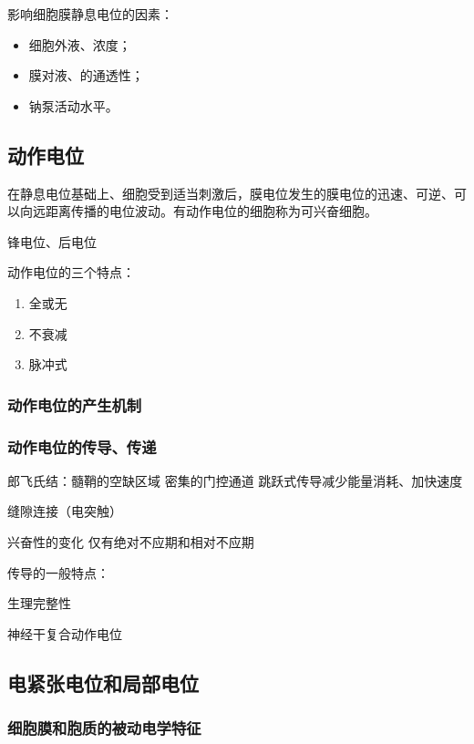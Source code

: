 影响细胞膜静息电位的因素：
\begin{itemize}
	\item 细胞外液、浓度；
	\item 膜对液、的通透性；
	\item 钠泵活动水平。
\end{itemize}

\subsection{动作电位}

在静息电位基础上、细胞受到适当刺激后，膜电位发生的膜电位的迅速、可逆、可以向远距离传播的电位波动。有动作电位的细胞称为可兴奋细胞。

锋电位、后电位

动作电位的三个特点：
\begin{enumerate}
	\item 全或无
	\item 不衰减
	\item 脉冲式
\end{enumerate}

\subsubsection{动作电位的产生机制}

\subsubsection{动作电位的传导、传递}

郎飞氏结：髓鞘的空缺区域 密集的门控通道  跳跃式传导减少能量消耗、加快速度

缝隙连接（电突触）

兴奋性的变化 仅有绝对不应期和相对不应期

传导的一般特点：
\begin{description}
	\item[生理完整性]
\end{description}

神经干复合动作电位

\subsection{电紧张电位和局部电位}

\subsubsection{细胞膜和胞质的被动电学特征}

